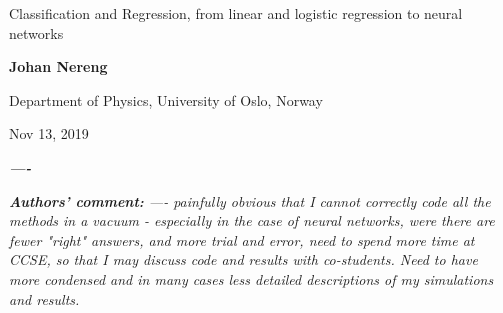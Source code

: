 \documentclass[%
oneside,                 %
final,                   %
10pt]{article}
\begin{document}

\newcommand{\exercisesection}[1]{\subsection*{#1}}






\thispagestyle{empty}

\begin{center}
{\LARGE\bf
\begin{spacing}{1.25}
Classification and Regression, from linear and logistic regression to neural networks
\end{spacing}
}
\end{center}


\begin{center}
{\bf Johan Nereng}
\end{center}

    \begin{center}
\centerline{{\small Department of Physics, University of Oslo, Norway}}
\end{center}
    

\begin{center}
Nov 13, 2019
\end{center}

\vspace{5cm}
\begin{abstract}
-------
\end{abstract}
\newpage




\textit{\textbf{----}} \newline


\textit{\textbf{Authors' comment:} ---- painfully obvious that I cannot correctly code all the methods in a vacuum - especially in the case of neural networks, were there are fewer "right" answers, and more trial and error, need to spend more time at CCSE, so that I may discuss code and results with co-students. Need to have more condensed and in many cases less detailed descriptions of my simulations and results. }
\newpage
\end{document}
